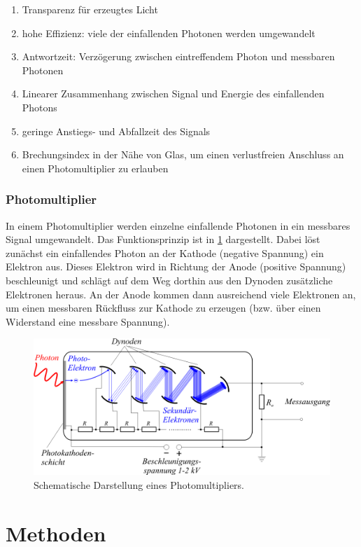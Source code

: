 \documentclass[
	a4paper,
	12pt,
	pagesize,
	ngerman
]{scrartcl}
\begin{document}
	\begin{enumerate}
		\item Transparenz für erzeugtes Licht
		\item hohe Effizienz: viele der einfallenden Photonen werden umgewandelt
		\item Antwortzeit: Verzögerung zwischen eintreffendem Photon und messbaren Photonen
		\item Linearer Zusammenhang zwischen Signal und Energie des einfallenden Photons
		\item geringe Anstiegs- und Abfallzeit des Signals
		\item Brechungsindex in der Nähe von Glas, um einen verlustfreien Anschluss an einen Photomultiplier zu erlauben
	\end{enumerate}

	\subsubsection{Photomultiplier}

	In einem Photomultiplier werden einzelne einfallende Photonen in ein messbares Signal umgewandelt.
	Das Funktionsprinzip ist in \cref{fig_Photomultiplier} dargestellt.
	Dabei löst zunächst ein einfallendes Photon an der Kathode (negative Spannung) ein Elektron aus.
	Dieses Elektron wird in Richtung der Anode (positive Spannung) beschleunigt und schlägt auf dem Weg dorthin aus den Dynoden zusätzliche Elektronen heraus.
	An der Anode kommen dann ausreichend viele Elektronen an, um einen messbaren Rückfluss zur Kathode zu erzeugen (bzw. über einen Widerstand eine messbare Spannung).

	\begin{figure}[H]
			\includegraphics[width=0.6\linewidth]{charts/Photomultiplier}
			\caption{
			Schematische Darstellung eines Photomultipliers.
			\cite{Photomultiplier}
			}
			\label{fig_Photomultiplier}
	\end{figure}



	\section{Methoden}
\end{document}
